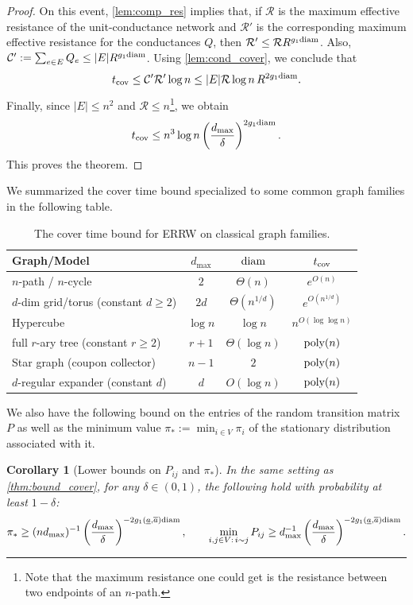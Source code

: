 \documentclass[a4paper, 11pt]{article}
\newcommand{\diam}{\textnormal{diam}}
\newcommand{\cov}{\textnormal{cov}}
\newcommand{\mc}{\mathcal{C}}
\newcommand{\mr}{\mathcal{R}}
\newcommand{\poly}{\textnormal{poly}}
\newtheorem{cor}[thm]{Corollary}
\begin{document}
\begin{proof}
On this event, \cref{lem:comp_res} implies that, if $\mr$ is the maximum effective resistance of the unit-conductance network and $\mr'$ is the corresponding maximum effective resistance for the conductances $Q$, then $\mr'\le \mr R^{g_1\diam}$. Also, $\mc':=\sum_{e\in E}Q_e\le |E|R^{g_1\diam}$. Using \cref{lem:cond_cover}, we conclude that
\[
t_\cov
\le
\mc'\mr'\log n
\le
|E|\mr\log n\,R^{2g_1\diam}.
\]
Finally, since $|E|\le n^2$ and $\mr\le n$\footnote{Note that the maximum resistance one could get is the resistance between two endpoints of an $n$-path.}, we obtain
\[
t_\cov
\le
n^3\log n
\left(\frac{d_{\max}}{\delta}\right)^{2g_1\diam}.
\]
This proves the theorem.
\end{proof}

We summarized the cover time bound specialized to some common graph families in the following table.

\begin{table}[h]
\label{table:cover-bd}
\centering
\begin{tabular}{|l|c|c|c|}
\hline
\textbf{Graph/Model} & $d_{\max}$ & $\diam$ & $t_\cov$ \\
\hline
$n$-path / $n$-cycle & $2$
& $\Theta(n)$ & $e^{O(n)}$ \\
\hline
$d$-dim grid/torus (constant $d\ge 2$) & $2d$
& $\Theta(n^{1/d})$ & $e^{O(n^{1/d})}$ \\
\hline
Hypercube & $\log n$
& $\log n$ & $n^{O(\log\log n)}$ \\
\hline
full $r$-ary tree (constant $r\ge 2$) & $r+1$
& $\Theta(\log n)$ & $\poly(n)$ \\
\hline
Star graph (coupon collector) & $n-1$
& $2$ & $\poly(n)$ \\
\hline
$d$-regular expander (constant $d$) & $d$
& $O(\log n)$ & $\poly(n)$ \\
\hline
\end{tabular}
\caption{The cover time bound for ERRW on classical graph families.}
\end{table}


We also have the following bound on the entries of the random transition matrix $P$ as well as the minimum value  $\pi_*:=\min_{i\in V}\pi_i$
of the stationary distribution associated with it.

\vspace{.3em}
\begin{cor}[Lower bounds on $P_{ij}$ and $\pi_*$]
  \label{cor:pi_star_gamma}
  In the same setting as \cref{thm:bound_cover}, for any $\delta\in(0,1)$, the following hold with probability at least $1-\delta$:
  \[
    \pi_* \ge (nd_{\max})^{-1}
    \left(\frac{d_{\max}}{\delta}\right)^{-2g_1(\underline a,\overline a)\diam},
    \qquad
    \min_{i,j\in V:\,i\sim j} P_{ij}
    \ge
    d_{\max}^{-1}
    \left(\frac{d_{\max}}{\delta}\right)^{-2g_1(\underline a,\overline a)\diam}.
  \]
\end{cor}
\end{document}
